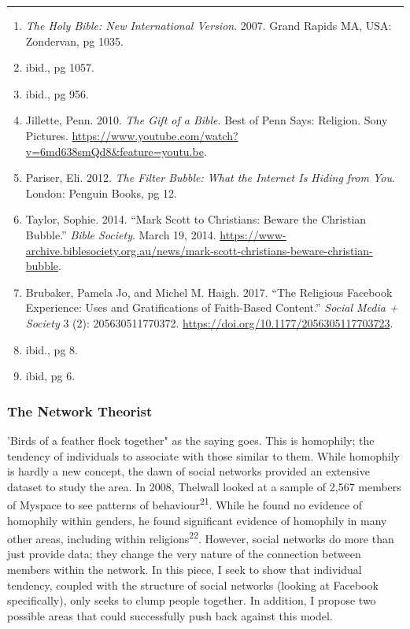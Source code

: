 \documentclass[]{article}
\providecommand{\tightlist}{%
  \setlength{\itemsep}{0pt}\setlength{\parskip}{0pt}}
\begin{document}
\begin{center}\rule{0.5\linewidth}{\linethickness}\end{center}

\begin{enumerate}
\def\labelenumi{\arabic{enumi}.}
\setcounter{enumi}{11}
\tightlist
\item
  \emph{The Holy Bible: New International Version}. 2007. Grand Rapids
  MA, USA: Zondervan, pg 1035.
\item
  ibid., pg 1057.
\item
  ibid., pg 956.
\item
  Jillette, Penn. 2010. \emph{The Gift of a Bible}. Best of Penn Says:
  Religion. Sony Pictures.
  \url{https://www.youtube.com/watch?v=6md638smQd8\&feature=youtu.be}.
\item
  Pariser, Eli. 2012. \emph{The Filter Bubble: What the Internet Is
  Hiding from You}. London: Penguin Books, pg 12.
\item
  Taylor, Sophie. 2014. ``Mark Scott to Christians: Beware the Christian
  Bubble.'' \emph{Bible Society}. March 19, 2014.
  \url{https://www-archive.biblesociety.org.au/news/mark-scott-christians-beware-christian-bubble}.
\item
  Brubaker, Pamela Jo, and Michel M. Haigh. 2017. ``The Religious
  Facebook Experience: Uses and Gratifications of Faith-Based Content.''
  \emph{Social Media + Society} 3 (2): 205630511770372.
  \url{https://doi.org/10.1177/2056305117703723}.
\item
  ibid., pg 8.
\item
  ibid, pg 6.
\end{enumerate}

\hypertarget{the-network-theorist}{%
\subsubsection{The Network Theorist}\label{the-network-theorist}}

'Birds of a feather flock together" as the saying goes. This is
homophily; the tendency of individuals to associate with those similar
to them. While homophily is hardly a new concept, the dawn of social
networks provided an extensive dataset to study the area. In 2008,
Thelwall looked at a sample of 2,567 members of Myspace to see patterns
of behaviour\textsuperscript{21}. While he found no evidence of
homophily within genders, he found significant evidence of homophily in
many other areas, including within religions\textsuperscript{22}.
However, social networks do more than just provide data; they change the
very nature of the connection between members within the network. In
this piece, I seek to show that individual tendency, coupled with the
structure of social networks (looking at Facebook specifically), only
seeks to clump people together. In addition, I propose two possible
areas that could successfully push back against this model.
\end{document}
